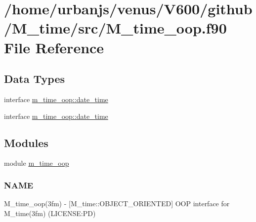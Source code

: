\hypertarget{M__time__oop_8f90}{}\section{/home/urbanjs/venus/\+V600/github/\+M\+\_\+time/src/\+M\+\_\+time\+\_\+oop.f90 File Reference}
\label{M__time__oop_8f90}
\subsection*{Data Types}
\begin{DoxyCompactItemize}
\item 
interface \mbox{\hyperlink{structm__time__oop_1_1date__time}{m\+\_\+time\+\_\+oop\+::date\+\_\+time}}
\item 
interface \mbox{\hyperlink{structm__time__oop_1_1date__time}{m\+\_\+time\+\_\+oop\+::date\+\_\+time}}
\end{DoxyCompactItemize}
\subsection*{Modules}
\begin{DoxyCompactItemize}
\item 
module \mbox{\hyperlink{namespacem__time__oop}{m\+\_\+time\+\_\+oop}}
\begin{DoxyCompactList}\small\item\em \subsubsection*{N\+A\+ME}

M\+\_\+time\+\_\+oop(3fm) -\/ \mbox{[}M\+\_\+time\+::\+O\+B\+J\+E\+C\+T\+\_\+\+O\+R\+I\+E\+N\+T\+ED\mbox{]} O\+OP interface for M\+\_\+time(3fm) (L\+I\+C\+E\+N\+SE\+:PD) \end{DoxyCompactList}\end{DoxyCompactItemize}
